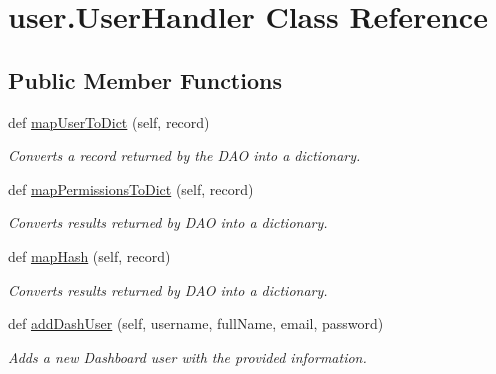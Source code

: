 \hypertarget{classuser_1_1_user_handler}{}\section{user.\+User\+Handler Class Reference}
\label{classuser_1_1_user_handler}
\subsection*{Public Member Functions}
\begin{DoxyCompactItemize}
\item 
\mbox{\label{classuser_1_1_user_handler_a74e5033271f5bd3a2e9e2e0a86ded938}} 
def \hyperlink{classuser_1_1_user_handler_a74e5033271f5bd3a2e9e2e0a86ded938}{map\+User\+To\+Dict} (self, record)
\begin{DoxyCompactList}\small\item\em Converts a record returned by the D\+AO into a dictionary. \end{DoxyCompactList}\item 
\mbox{\label{classuser_1_1_user_handler_a9f59c6c16649455a8b9c09c2ad263e7c}} 
def \hyperlink{classuser_1_1_user_handler_a9f59c6c16649455a8b9c09c2ad263e7c}{map\+Permissions\+To\+Dict} (self, record)
\begin{DoxyCompactList}\small\item\em Converts results returned by D\+AO into a dictionary. \end{DoxyCompactList}\item 
\mbox{\label{classuser_1_1_user_handler_a377752f91d54adcd299580464331111e}} 
def \hyperlink{classuser_1_1_user_handler_a377752f91d54adcd299580464331111e}{map\+Hash} (self, record)
\begin{DoxyCompactList}\small\item\em Converts results returned by D\+AO into a dictionary. \end{DoxyCompactList}\item 
def \hyperlink{classuser_1_1_user_handler_a1bb6eb54e9d789a656651ab012c25a8c}{add\+Dash\+User} (self, username, full\+Name, email, password)
\begin{DoxyCompactList}\small\item\em Adds a new Dashboard user with the provided information. \end{DoxyCompactList}\item 

\end{DoxyCompactItemize}
